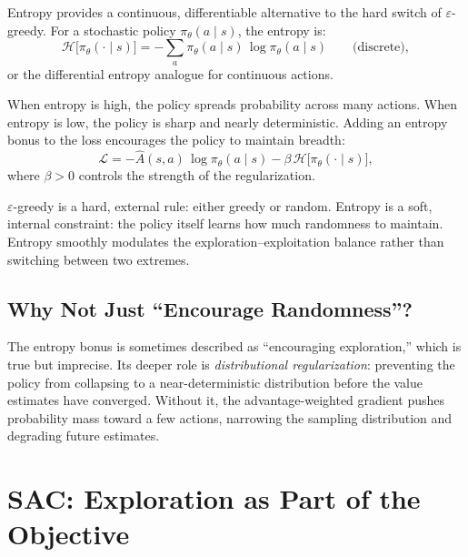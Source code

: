 Entropy provides a continuous, differentiable alternative to the hard switch of $\varepsilon$-greedy. For a stochastic policy $\pi_\theta(a \mid s)$, the entropy is:
\begin{equation}
  \mathcal{H}\bigl[\pi_\theta(\cdot \mid s)\bigr]
  = -\sum_a \pi_\theta(a \mid s)\,\log\pi_\theta(a \mid s)
  \qquad\text{(discrete)},
\end{equation}
or the differential entropy analogue for continuous actions.

When entropy is high, the policy spreads probability across many actions. When entropy is low, the policy is sharp and nearly deterministic. Adding an entropy bonus to the loss encourages the policy to maintain breadth:
\begin{equation}
  \mathcal{L} = -\hat{A}(s,a)\,\log\pi_\theta(a \mid s) - \beta\,\mathcal{H}\bigl[\pi_\theta(\cdot \mid s)\bigr],
\end{equation}
where $\beta > 0$ controls the strength of the regularization.

\begin{keyidea}
$\varepsilon$-greedy is a hard, external rule: either greedy or random. Entropy is a soft, internal constraint: the policy itself learns how much randomness to maintain. Entropy smoothly modulates the exploration--exploitation balance rather than switching between two extremes.
\end{keyidea}

\subsection{Why Not Just ``Encourage Randomness''?}

The entropy bonus is sometimes described as ``encouraging exploration,'' which is true but imprecise. Its deeper role is \emph{distributional regularization}: preventing the policy from collapsing to a near-deterministic distribution before the value estimates have converged. Without it, the advantage-weighted gradient pushes probability mass toward a few actions, narrowing the sampling distribution and degrading future estimates.

\section{SAC: Exploration as Part of the Objective}
\label{sec:sac-exploration}

